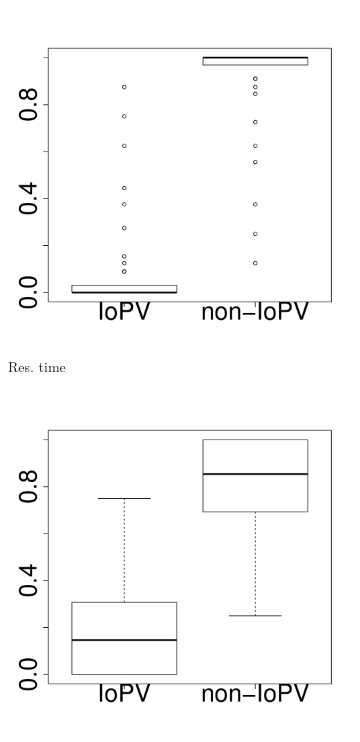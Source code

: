 \documentclass[10pt,journal,compsoc]{IEEEtran}
\begin{document}
\begin{figure}[t]
	\centering
        \begin{subfigure}{0.19\textwidth}
                \includegraphics[width=\linewidth]{Figures/runtime-hadoop-boxplot.pdf}
                \caption{Res. time}
        \end{subfigure}%
        \begin{subfigure}{0.19\textwidth}
                \includegraphics[width=\linewidth]{Figures/cpu-hadoop-boxplot.pdf}

\end{subfigure}
\end{figure}
\end{document}
